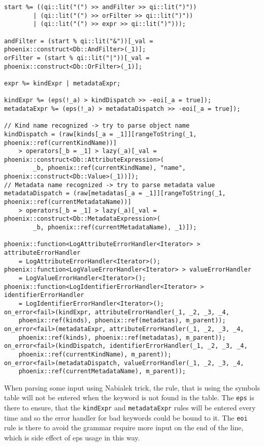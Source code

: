 \documentclass[deska]{subfiles}
\begin{document}
\begin{verbatim}
start %= ((qi::lit("(") >> andFilter >> qi::lit(")"))
        | (qi::lit("(") >> orFilter >> qi::lit(")"))
        | (qi::lit("(") >> expr >> qi::lit(")")));

andFilter = (start % qi::lit("&"))[_val = phoenix::construct<Db::AndFilter>(_1)];
orFilter = (start % qi::lit("|"))[_val = phoenix::construct<Db::OrFilter>(_1)];

expr %= kindExpr | metadataExpr;

kindExpr %= (eps(!_a) > kindDispatch >> -eoi[_a = true]);
metadataExpr %= (eps(!_a) > metadataDispatch >> -eoi[_a = true]);

// Kind name recognized -> try to parse object name
kindDispatch = (raw[kinds[_a = _1]][rangeToString(_1, phoenix::ref(currentKindName))]
    > operators[_b = _1] > lazy(_a)[_val = phoenix::construct<Db::AttributeExpression>(
        _b, phoenix::ref(currentKindName), "name", phoenix::construct<Db::Value>(_1))]);
// Metadata name recognized -> try to parse metadata value
metadataDispatch = (raw[metadatas[_a = _1]][rangeToString(_1, phoenix::ref(currentMetadataName))]
    > operators[_b = _1] > lazy(_a)[_val = phoenix::construct<Db::MetadataExpression>(
        _b, phoenix::ref(currentMetadataName), _1)]);
        
phoenix::function<LogAttributeErrorHandler<Iterator> > attributeErrorHandler
    = LogAttributeErrorHandler<Iterator>();
phoenix::function<LogValueErrorHandler<Iterator> > valueErrorHandler
    = LogValueErrorHandler<Iterator>();
phoenix::function<LogIdentifierErrorHandler<Iterator> > identifierErrorHandler
    = LogIdentifierErrorHandler<Iterator>();
on_error<fail>(kindExpr, attributeErrorHandler(_1, _2, _3, _4,
    phoenix::ref(kinds), phoenix::ref(metadatas), m_parent));
on_error<fail>(metadataExpr, attributeErrorHandler(_1, _2, _3, _4,
    phoenix::ref(kinds), phoenix::ref(metadatas), m_parent));
on_error<fail>(kindDispatch, identifierErrorHandler(_1, _2, _3, _4,
    phoenix::ref(currentKindName), m_parent));
on_error<fail>(metadataDispatch, valueErrorHandler(_1, _2, _3, _4,
    phoenix::ref(currentMetadataName), m_parent));
\end{verbatim} 

When parsing some input using Nabialek trick, the rule, that is using the symbols table will not be entered when the keyword
is not found in the table. The {\tt eps} is there to ensure, that the {\tt kindExpr} and {\tt metadataExpr} rules will be
entered every time and so the error handler for bad keywords could be bound to it. The {\tt eoi} rule is there to avoid
the grammar require more input on the end of the line, which is side effect of eps usage in this way.
\end{document}
